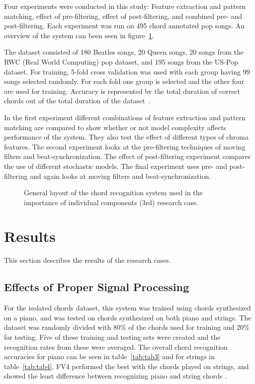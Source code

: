 \documentclass{sig-alternate}
\begin{document}
Four experiments were conducted in this study: Feature extraction and pattern matching, effect of pre-filtering, effect of post-filtering, and combined pre- and post-filtering. Each experiment was run on 495 chord annotated pop songs. An overview of the system can been seen in figure~\ref{fig:fig3}.

The dataset consisted of 180 Beatles songs, 20 Queen songs, 20 songs from the RWC (Real World Computing) pop dataset, and 195 songs from the US-Pop dataset. For training, 5-fold cross validation was used with each group having 99 songs selected randomly. For each fold one group is selected and the other four are used for training. Accuracy is represented by the total duration of correct chords out of the total duration of the dataset~\cite{TaeMin:2014}.

In the first experiment different combinations of feature extraction and pattern matching are compared to show whether or not model complexity affects performance of the system. They also test the effect of different types of chroma features. The second experiment looks at the pre-filtering techniques of moving filters and beat-synchronization. The effect of post-filtering experiment compares the use of different stochastic models. The final experiment uses pre- and post-filtering and again looks at moving filters and beat-synchronization.


\begin{figure}
\centering
{}
\caption{General layout of the chord recognition system used in the importance of individual components (3rd) research case.}
\label{fig:fig3}
\end{figure}

\section{Results}

This section describes the results of the research cases.

\subsection{Effects of Proper Signal Processing}

For the isolated chords dataset, this system was trained using chords synthesized on a piano, and was tested on chords synthesized on both piano and strings. The dataset was randomly divided with 80\% of the chords used for training and 20\% for testing. Five of these training and testing sets were created and the recognition rates from these were averaged. The overall chord recognition accuracies for piano can be seen in table~\ref{tab:tab3} and for strings in table~\ref{tab:tab4}. FV4 performed the best with the chords played on strings, and showed the least difference between recognizing piano and string chords \cite{Morman:2006}.
\end{document}
